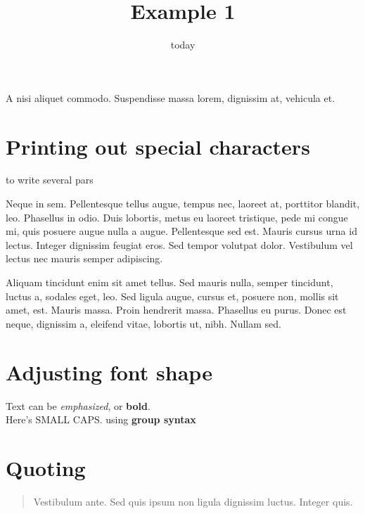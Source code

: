 \documentclass[a4paper,16pt]{article}
\title{Example 1}
\author{\7}
\date{today}
\newcommand{\7}{the m7tkr}
\begin{document}
\maketitle

\noindent A nisi aliquet commodo. Suspendisse massa lorem, dignissim at, vehicula et.

\section{Printing out special characters}

 to write several pars

{\centering \begin{minipage}{10cm}
Neque in sem. Pellentesque tellus augue, tempus nec, laoreet at, porttitor
blandit, leo. Phasellus in odio. Duis lobortis, metus eu laoreet tristique, pede
mi congue mi, quis posuere augue nulla a augue. Pellentesque sed est. Mauris
cursus urna id lectus. Integer dignissim feugiat eros. Sed tempor volutpat
    dolor. Vestibulum vel lectus nec mauris semper adipiscing.\\[1cm]
\end{minipage}

}

Aliquam tincidunt enim sit amet tellus. Sed mauris nulla, semper tincidunt,
luctus a, sodales eget, leo. Sed ligula augue, cursus et, posuere non, mollis
sit amet, est. Mauris massa. Proin hendrerit massa. Phasellus eu purus. Donec
est neque, dignissim a, eleifend vitae, lobortis ut, nibh. Nullam sed.

\section{Adjusting font shape}
Text can be \emph{emphasized}, or \textbf{bold}.\\
Here's \textsc{SMALL CAPS}.
using {\bfseries group syntax}

\section{Quoting}
\begin{quote}
Vestibulum ante. Sed quis ipsum non ligula dignissim luctus. Integer quis.
\end{quote}
\end{document}

